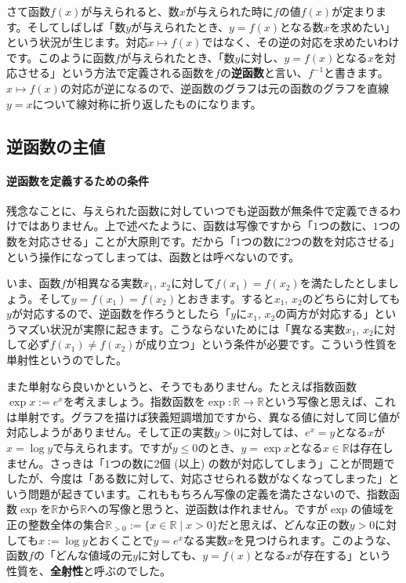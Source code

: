 さて函数$f(x)$が与えられると、数$x$が与えられた時に$f$の値$f(x)$が定まります。そしてしばしば「数$y$が与えられたとき、$y=f(x)$となる数$x$を求めたい」という状況が生じます。対応$x\mapsto f(x)$ではなく、その逆の対応を求めたいわけです。このように函数$f$が与えられたとき、「数$y$に対し、$y=f(x)$となる$x$を対応させる」という方法で定義される函数を$f$の\textbf{逆函数}と言い、$f^{-1}$と書きます。$x\mapsto f(x)$の対応が逆になるので、逆函数のグラフは元の函数のグラフを直線$y=x$について線対称に折り返したものになります。

\subsection{逆函数の主値}

\paragraph{逆函数を定義するための条件} 残念なことに、与えられた函数に対していつでも逆函数が無条件で定義できるわけではありません。上で述べたように、函数は写像ですから「$1$つの数に、$1$つの数を対応させる」ことが大原則です。だから「$1$つの数に$2$つの数を対応させる」という操作になってしまっては、函数とは呼べないのです。

いま、函数$f$が相異なる実数$x_1$, $x_2$に対して$f(x_1)=f(x_2)$を満たしたとしましょう。そして$y=f(x_1)=f(x_2)$とおきます。すると$x_1$, $x_2$のどちらに対しても$y$が対応するので、逆函数を作ろうとしたら「$y$に$x_1$, $x_2$の両方が対応する」というマズい状況が実際に起きます。こうならないためには「異なる実数$x_1$, $x_2$に対して必ず$f(x_1)\neq f(x_2)$が成り立つ」という条件が必要です。こういう性質を$\textbf{単射性}$というのでした。

また単射なら良いかというと、そうでもありません。たとえば指数函数$\exp x:=e^x$を考えましょう。指数函数を$\exp\colon \mathbb{R}\rightarrow\mathbb{R}$という写像と思えば、これは単射です。グラフを描けば狭義短調増加ですから、異なる値に対して同じ値が対応しようがありません。そして正の実数$y>0$に対しては、$e^x = y$となる$x$が$x=\log y$で与えられます。ですが$y\leq 0$のとき、$y=\exp x$となる$x\in\mathbb{R}$は存在しません。さっきは「$1$つの数に$2$個 (以上) の数が対応してしまう」ことが問題でしたが、今度は「ある数に対して、対応させられる数がなくなってしまった」という問題が起きています。これももちろん写像の定義を満たさないので、指数函数$\exp$を$\mathbb{R}$から$\mathbb{R}$への写像と思うと、逆函数は作れません。ですが$\exp$の値域を正の整数全体の集合$\mathbb{R}_{>0}:=\{x\in\mathbb{R} \mid x>0 \}$だと思えば、どんな正の数$y>0$に対しても$x:=\log y$とおくことで$y=e^x$なる実数$x$を見つけられます。このような、函数$f$の「どんな値域の元$y$に対しても、$y=f(x)$となる$x$が存在する」という性質を、\textbf{全射性}と呼ぶのでした。

